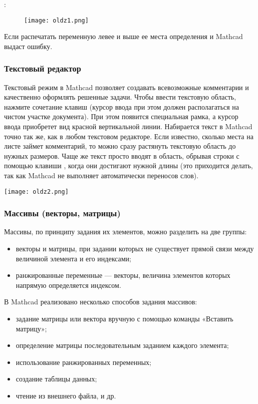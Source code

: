 :
\begin{figure}[h]
	\begin{center}
		\texttt{[image: oldz1.png]}
	\end{center}
\end{figure}

Если распечатать переменную  левее и выше ее места определения и Mathcad выдаст ошибку.

\subsubsection*{Текстовый редактор}
Текстовый режим в Mathcad позволяет создавать всевозможные комментарии и качественно оформлять решенные задачи.
Чтобы ввести текстовую область, нажмите сочетание клавиш  (курсор ввода при этом должен располагаться на чистом участке документа). При этом появится специальная рамка, а курсор ввода приобретет вид красной вертикальной линии.
Набирается текст в Mathcad точно так же, как в любом текстовом редакторе. Если известно, сколько места на листе займет комментарий, то можно сразу растянуть текстовую область до нужных размеров. Чаще же текст просто вводят в область, обрывая строки с помощью клавиши \keys{\enter}, когда они достигают нужной длины (это приходится делать, так как Mathcad не выполняет автоматически переносов слов).


\begin{center}
	\texttt{[image: oldz2.png]}
\end{center}


\subsubsection{Массивы (векторы, матрицы)}
Массивы, по принципу задания их элементов, можно разделить на две группы:
\begin{itemize}
	\item векторы и матрицы, при задании которых не существует прямой связи между величиной элемента и его индексами;
	\item ранжированные переменные --- векторы, величина элементов которых напрямую определяется индексом.
\end{itemize}
В Mathcad реализовано несколько способов задания массивов:
\begin{itemize}
	\item задание матрицы или вектора вручную с помощью команды «Вставить матрицу»;
	\item определение матрицы последовательным заданием каждого элемента;
	\item  использование ранжированных переменных;
	\item создание таблицы данных;
	\item чтение из внешнего файла, и др.
\end{itemize}

